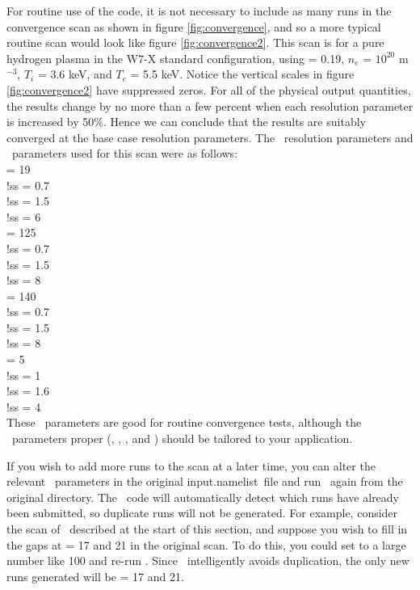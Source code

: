 For routine use of the code, it is not necessary to include as many
runs in the convergence scan as shown in figure \ref{fig:convergence},
and so a more typical routine scan would look like figure \ref{fig:convergence2}.
This scan is for a pure hydrogen plasma in the W7-X standard configuration, using  = 0.19,
$n_e$ = $10^{20}$ m$^{-3}$, $T_i$ = 3.6 keV, and $T_e$ = 5.5 keV.
Notice the vertical scales in figure \ref{fig:convergence2} have suppressed zeros.
For all of the physical output quantities, the results change by no more than a few percent when each resolution
parameter is increased by 50\%. Hence we can conclude that 
the results are suitably converged at the base case resolution parameters.
The \sfincs~resolution parameters and \sfincsScan~parameters used for this scan were as follows:\\
{\ttfamily
\Ntheta = 19 \\
!ss  = 0.7 \\
!ss  = 1.5 \\
!ss  = 6 \\
\Nzeta = 125 \\
!ss  = 0.7 \\
!ss  = 1.5 \\
!ss  = 8 \\
\Nxi = 140 \\
!ss  = 0.7 \\
!ss  = 1.5 \\
!ss  = 8 \\
\Nx = 5 \\
!ss  = 1 \\
!ss  = 1.6 \\
!ss  = 4 \\
}
These \sfincsScan~parameters are good for routine convergence tests, although the \sfincs~parameters proper
(\Ntheta, \Nzeta, \Nxi, and \Nx) should be tailored to your application.

If you wish to add more runs to the scan at a later time,
you can alter the relevant \sfincsScan~parameters in the original {\ttfamily input.namelist}~file
and run \sfincsScan~again from the original directory.  The \sfincsScan~code will automatically detect which runs
have already been submitted, so duplicate runs will not be generated.
For example, consider the scan of \Ntheta~described at the start of this section,
and suppose you wish to fill in the gaps at \Ntheta = 17 and 21 in the original scan.
To do this, you could set  to a large number like 100
and re-run \sfincsScan.  Since \sfincsScan~intelligently avoids duplication,
the only new runs generated will be  \Ntheta = 17 and 21.

